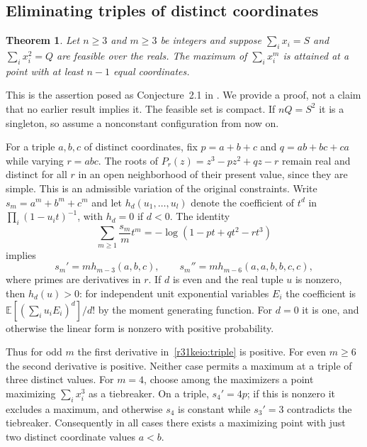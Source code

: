\documentclass[11pt,a4paper]{article}
\numberwithin{equation}{section}
\newtheorem{theorem}{Theorem}[section]
\theoremstyle{definition}
\theoremstyle{remark}
\begin{document}
\subsection{Eliminating triples of distinct coordinates}
\begin{theorem}
Let $n\ge3$ and $m\ge3$ be integers and suppose $\sum_i x_i=S$ and $\sum_i x_i^2=Q$ are feasible over the reals. The maximum of $\sum_i x_i^m$ is attained at a point with at least $n-1$ equal coordinates.
\end{theorem}
This is the assertion posed as Conjecture~2.1 in \cite{r31keio:c}. We provide a proof, not a claim that no earlier result implies it. The feasible set is compact. If $nQ=S^2$ it is a singleton, so assume a nonconstant configuration from now on.

For a triple $a,b,c$ of distinct coordinates, fix $p=a+b+c$ and $q=ab+bc+ca$ while varying $r=abc$. The roots of $P_r(z)=z^3-pz^2+qz-r$ remain real and distinct for all $r$ in an open neighborhood of their present value, since they are simple. This is an admissible variation of the original constraints. Write $s_m=a^m+b^m+c^m$ and let $h_d(u_1,\ldots,u_l)$ denote the coefficient of $t^d$ in $\prod_i(1-u_i t)^{-1}$, with $h_d=0$ if $d<0$. The identity
\[
 \sum_{m\ge1}\frac{s_m}{m}t^m=-\log(1-pt+qt^2-rt^3)
\]
implies
\begin{equation}
 s_m'=m h_{m-3}(a,b,c),\qquad
 s_m''=m h_{m-6}(a,a,b,b,c,c),\label{r31keio:triple}
\end{equation}
where primes are derivatives in $r$. If $d$ is even and the real tuple $u$ is nonzero, then $h_d(u)>0$: for independent unit exponential variables $E_i$ the coefficient is $\mathbb E[(\sum_i u_i E_i)^d]/d!$ by the moment generating function. For $d=0$ it is one, and otherwise the linear form is nonzero with positive probability.

Thus for odd $m$ the first derivative in~\eqref{r31keio:triple} is positive. For even $m\ge6$ the second derivative is positive. Neither case permits a maximum at a triple of three distinct values. For $m=4$, choose among the maximizers a point maximizing $\sum_i x_i^3$ as a tiebreaker. On a triple, $s_4'=4p$; if this is nonzero it excludes a maximum, and otherwise $s_4$ is constant while $s_3'=3$ contradicts the tiebreaker. Consequently in all cases there exists a maximizing point with just two distinct coordinate values $a<b$.
\end{document}
